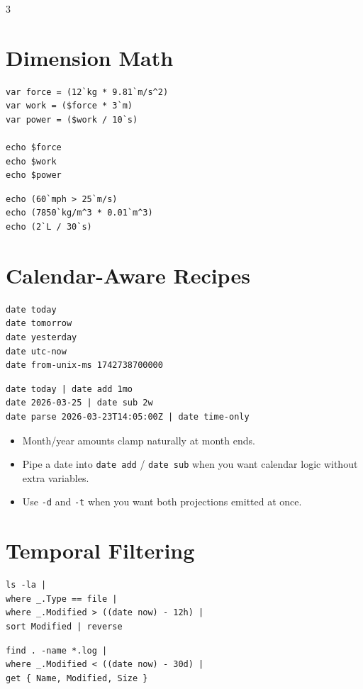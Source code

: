 \begin{multicols*}{3}
\section{Dimension Math}
\begin{lstlisting}
var force = (12`kg * 9.81`m/s^2)
var work = ($force * 3`m)
var power = ($work / 10`s)

echo $force
echo $work
echo $power
\end{lstlisting}

\begin{lstlisting}
echo (60`mph > 25`m/s)
echo (7850`kg/m^3 * 0.01`m^3)
echo (2`L / 30`s)
\end{lstlisting}

\columnbreak

\section{Calendar-Aware Recipes}
\begin{lstlisting}
date today
date tomorrow
date yesterday
date utc-now
date from-unix-ms 1742738700000
\end{lstlisting}

\begin{lstlisting}
date today | date add 1mo
date 2026-03-25 | date sub 2w
date parse 2026-03-23T14:05:00Z | date time-only
\end{lstlisting}

\begin{itemize}
\item Month/year amounts clamp naturally at month ends.
\item Pipe a date into \texttt{date add} / \texttt{date sub} when you want calendar logic without extra variables.
\item Use \texttt{-d} and \texttt{-t} when you want both projections emitted at once.
\end{itemize}

\section{Temporal Filtering}
\begin{lstlisting}
ls -la |
where _.Type == file |
where _.Modified > ((date now) - 12h) |
sort Modified | reverse
\end{lstlisting}

\begin{lstlisting}
find . -name *.log |
where _.Modified < ((date now) - 30d) |
get { Name, Modified, Size }
\end{lstlisting}


\end{multicols*}
